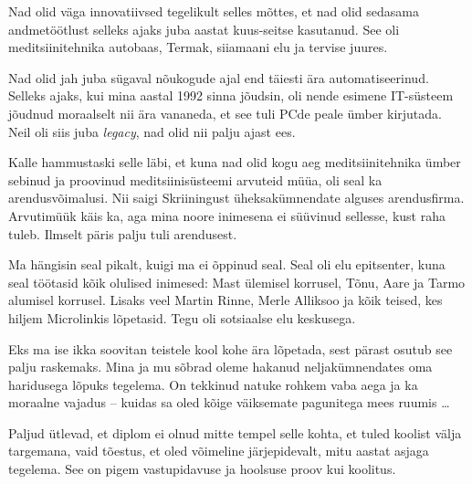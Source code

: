 Nad olid väga innovatiivsed tegelikult selles mõttes, et nad olid 
sedasama andmetöötlust selleks ajaks juba aastat kuus-seitse kasutanud. See oli 
 meditsiinitehnika autobaas, Termak, siiamaani elu ja tervise 
juures. 



Nad olid jah juba sügaval nõukogude ajal end täiesti ära automatiseerinud. 
Selleks 
ajaks, kui mina aastal 1992 sinna jõudsin, oli nende esimene IT-süsteem 
jõudnud moraalselt nii ära vananeda, et see tuli PCde peale ümber 
kirjutada. Neil oli siis juba \emph{legacy}, nad olid nii palju ajast 
ees.


Kalle hammustaski selle läbi, et kuna nad olid kogu 
aeg meditsiinitehnika ümber sebinud ja proovinud meditsiinisüsteemi arvuteid 
müüa, oli seal ka arendusvõimalusi. Nii saigi Skriiningust 
üheksakümnendate alguses arendusfirma. Arvutimüük käis ka, aga mina  
noore inimesena ei süüvinud sellesse, kust raha tuleb. Ilmselt päris palju tuli 
arendusest.



Ma hängisin seal pikalt, kuigi ma ei õppinud seal. Seal oli 
elu epitsenter, kuna seal töötasid kõik olulised inimesed: 
Mast ülemisel korrusel, Tõnu, 
Aare ja Tarmo alumisel 
korrusel. Lisaks veel 
Martin Rinne, Merle Alliksoo ja kõik teised, kes hiljem Microlinkis lõpetasid. Tegu
oli sotsiaalse elu keskusega. 


Eks ma ise ikka soovitan teistele kool kohe 
ära lõpetada, sest pärast osutub see palju raskemaks. Mina ja mu sõbrad oleme 
hakanud 
neljakümnendates oma haridusega lõpuks tegelema. On 
tekkinud natuke rohkem vaba aega ja ka moraalne vajadus –
kuidas sa oled kõige väiksemate pagunitega mees ruumis \ldots


Paljud ütlevad, et diplom ei olnud mitte tempel selle 
kohta, et tuled koolist välja targemana, vaid tõestus, et 
oled võimeline järjepidevalt, mitu aastat asjaga tegelema. See on pigem 
vastupidavuse ja hoolsuse proov kui koolitus.

